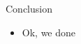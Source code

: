 \begin{frame}{Conclusion}
    \begin{itemize}
        \item Ok, we done
    \end{itemize}
\end{frame}